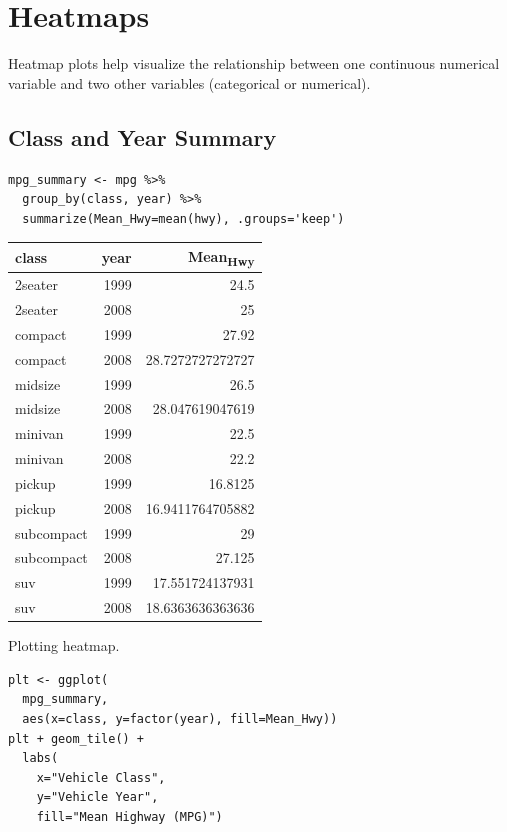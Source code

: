 \documentclass[11pt]{article}
\begin{document}
\section{Heatmaps}
\label{sec:org74e59e4}

Heatmap plots help visualize the relationship between one continuous numerical variable and two other variables (categorical or numerical).

\subsection{Class and Year Summary}
\label{sec:org7a11ba3}

\begin{verbatim}
mpg_summary <- mpg %>%
  group_by(class, year) %>%
  summarize(Mean_Hwy=mean(hwy), .groups='keep')
\end{verbatim}

\begin{org}
\begin{center}
\begin{tabular}{lrr}
class & year & Mean\textsubscript{Hwy}\\
\hline
2seater & 1999 & 24.5\\
2seater & 2008 & 25\\
compact & 1999 & 27.92\\
compact & 2008 & 28.7272727272727\\
midsize & 1999 & 26.5\\
midsize & 2008 & 28.047619047619\\
minivan & 1999 & 22.5\\
minivan & 2008 & 22.2\\
pickup & 1999 & 16.8125\\
pickup & 2008 & 16.9411764705882\\
subcompact & 1999 & 29\\
subcompact & 2008 & 27.125\\
suv & 1999 & 17.551724137931\\
suv & 2008 & 18.6363636363636\\
\end{tabular}
\end{center}
\end{org}

Plotting heatmap.

\begin{verbatim}
plt <- ggplot(
  mpg_summary,
  aes(x=class, y=factor(year), fill=Mean_Hwy))
plt + geom_tile() +
  labs(
    x="Vehicle Class",
    y="Vehicle Year",
    fill="Mean Highway (MPG)")
\end{verbatim}
\end{document}

